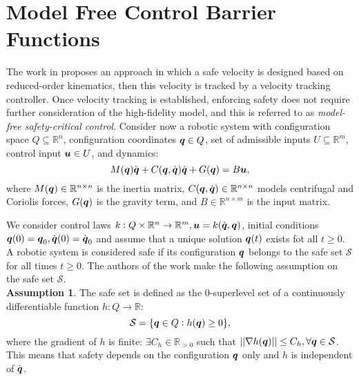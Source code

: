 \section{Model Free Control Barrier Functions}
The work in \cite{mf_cbf} proposes an approach in which a safe velocity is designed based on reduced-order kinematics, then this velocity is tracked by a velocity tracking controller. Once velocity tracking is established, enforcing safety does not require further consideration of the high-fidelity model, and this is referred to as \textit{model-free safety-critical control}.
Consider now a robotic system with configuration space $Q \subseteq \mathbb{R}^n$, configuration coordinates ${\boldsymbol{q}} \in Q$, set of admissible inputs $U\subseteq \mathbb{R}^m$, control input $\boldsymbol{u} \in U$, and dynamics:
\begin{equation} \label{eq:dynamic model}
    M({\boldsymbol{q}})\ddot{{\boldsymbol{q}}}+C({\boldsymbol{q}},\dot{{\boldsymbol{q}}})\dot{{\boldsymbol{q}}}+G({\boldsymbol{q}})=B\boldsymbol{u},
\end{equation}
where $M({\boldsymbol{q}})\in\mathbb{R}^{n \times n}$ is the inertia matrix, $C({\boldsymbol{q}},\dot{{\boldsymbol{q}}})\in\mathbb{R}^{n \times n}$ models centrifugal and Coriolis forces, $G({\boldsymbol{q}})$ is the gravity term, and $B\in\mathbb{R}^{n \times m}$ is the input matrix.

We consider control laws $ k:Q\times \mathbb{R}^n \rightarrow \mathbb{R}^m, \boldsymbol{u}=k(\dot{{\boldsymbol{q}}},{\boldsymbol{q}})$, initial conditions ${\boldsymbol{q}}(0) = {\boldsymbol{q}}_0, \dot{{\boldsymbol{q}}}(0)=\dot{{\boldsymbol{q}}}_0$ and assume that a unique solution ${\boldsymbol{q}}(t)$ exists fot all $t \geq 0$. A robotic system is considered safe if its configuration ${\boldsymbol{q}}$ belongs to the safe set $\mathcal{S}$ for all times $t\geq 0$. The authors of the work \cite{mf_cbf} make the following assumption on the safe set $\mathcal{S}$.\\
\textbf{Assumption 1}. The safe set is defined as the 0-superlevel set of a continuously differentiable function $h: Q \rightarrow \mathbb{R}$:
\begin{equation} \label{eq:safe set}
    \mathcal{S} = \{{\boldsymbol{q}} \in Q: h({\boldsymbol{q}})\geq 0 \},
\end{equation}
where the gradient of $h$ is finite: $\exists C_h \in \mathbb{R}_{>0}$ such that $|| \nabla h({\boldsymbol{q}})|| \leq C_h, \forall {\boldsymbol{q}} \in \mathcal{S}$. This means that safety depends on the configuration ${\boldsymbol{q}}$ only and $h$ is independent of $\dot{{\boldsymbol{q}}}$.

